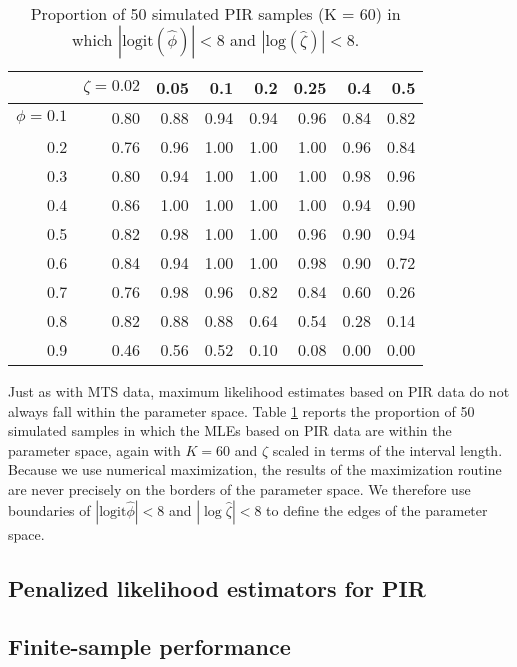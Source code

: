\documentclass[man, noextraspace, floatsintext]{apa6}\usepackage[]{graphicx}\usepackage[]{color}
\newcommand{\logit}{\text{logit}}
\begin{document}
\begin{table}[b]
\centering
\caption{Proportion of 50 simulated PIR samples (K = 60) in which  $|\text{logit}(\hat\phi)| < 8$ and $|\text{log}(\hat\zeta)| < 8$.} 
\label{tab:PIR_ests_valid}
\begin{tabular}{rrrrrrrr}
  \hline
 & $\zeta = 0.02$ & 0.05 & 0.1 & 0.2 & 0.25 & 0.4 & 0.5 \\ 
  \hline
$\phi = 0.1$ & 0.80 & 0.88 & 0.94 & 0.94 & 0.96 & 0.84 & 0.82 \\ 
  0.2 & 0.76 & 0.96 & 1.00 & 1.00 & 1.00 & 0.96 & 0.84 \\ 
  0.3 & 0.80 & 0.94 & 1.00 & 1.00 & 1.00 & 0.98 & 0.96 \\ 
  0.4 & 0.86 & 1.00 & 1.00 & 1.00 & 1.00 & 0.94 & 0.90 \\ 
  0.5 & 0.82 & 0.98 & 1.00 & 1.00 & 0.96 & 0.90 & 0.94 \\ 
  0.6 & 0.84 & 0.94 & 1.00 & 1.00 & 0.98 & 0.90 & 0.72 \\ 
  0.7 & 0.76 & 0.98 & 0.96 & 0.82 & 0.84 & 0.60 & 0.26 \\ 
  0.8 & 0.82 & 0.88 & 0.88 & 0.64 & 0.54 & 0.28 & 0.14 \\ 
  0.9 & 0.46 & 0.56 & 0.52 & 0.10 & 0.08 & 0.00 & 0.00 \\ 
   \hline
\end{tabular}
\end{table}


Just as with MTS data, maximum likelihood estimates based on PIR data do not always fall within the parameter space. Table \ref{tab:PIR_ests_valid} reports the proportion of 50 simulated samples in which the MLEs based on PIR data are within the parameter space, again with $K = 60$ and $\zeta$ scaled in terms of the interval length. Because we use numerical maximization, the results of the maximization routine are never precisely on the borders of the parameter space. We therefore use boundaries of $|\logit \hat\phi| < 8$ and $|\log \hat\zeta| < 8$ to define the edges of the parameter space.

\subsection{Penalized likelihood estimators for PIR}

\subsection{Finite-sample performance}
\end{document}
